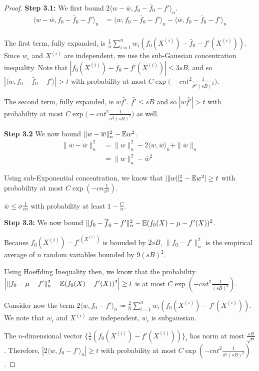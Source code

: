 \begin{proof}
\textbf{Step 3.1:} We first bound $2 \langle w - \bar{w}, f_0 - \bar{f}_0 - f'\rangle_n$.
\begin{align*}
\langle w - \bar{w}, f_0 - \bar{f}_0 - f'\rangle_n &=
      \langle w, f_0 - \bar{f}_0 - f'\rangle_n 
      - \langle \bar{w}, f_0 - \bar{f}_0 - f'\rangle_n \\
\end{align*}

The first term, fully expanded, is $\frac{1}{n} \sum_{i=1}^n w_i (f_0(X^{(i)}) - \bar{f}_0 - f'(X^{(i)}))$. Since $w_i$ and $X^{(i)}$ are independent, we use the sub-Gaussian concentration inequality. Note that $|f_0(X^{(i)}) - \bar{f}_0 - f'(X^{(i)})| \leq 3sB$, and so $|\langle w, f_0 - \bar{f}_0 - f' \rangle| > t$ with probability at most $C \exp\big( - c n t^2 \frac{1}{\sigma^2 (sB)^2} \big)$.

The second term, fully expanded, is $\bar{w} \bar{f'}$. $\bar{f'} \leq sB$ and so $|\bar{w}\bar{f'}| > t$ with probability at most $C \exp\big( - c n t^2 \frac{1}{\sigma^2(sB)^2} \big)$ as well.

\textbf{Step 3.2} We now bound $\| w - \overline{w} \|_n^2 - {\mathbb E} w^2$. 
\begin{align*}
\|w - \bar{w} \|_n^2 &= \|w\|_n^2 - 2 \langle w, \bar{w} \rangle_n + \|\bar{w}\|_n \\
               &= \|w\|_n^2 - \bar{w}^2
\end{align*}

Using sub-Exponential concentration, we know that $| \|w\|_n^2 - {\mathbb E} w^2 | \geq t$ with probability at most $C \exp( - c n \frac{1}{\sigma^2})$. 

$\bar{w} \leq \sigma\frac{1}{cn}$ with probability at least $1-\frac{C}{n}$. 

\textbf{Step 3.3:} We now bound $\| f_0 - \overline{f}_0 - f'\|_n^2 - {\mathbb E}(f_0(X) - \mu - f'(X))^2$.

Because $f_0(X^{(i)}) - f'^(X^{(i)})$ is bounded by $2sB$, $\| f_0 - f'\|_n^2$ is the empirical average of $n$ random variables bounded by $9(sB)^2$. 

Using Hoeffding Inequality then, we know that the probability $\Big| \| f_0 -\mu - f' \|_n^2 - {\mathbb E}(f_0(X) - f '(X))^2 \Big| \geq t $ is at most $C \exp( - c n t^2 \frac{1}{(sB)^4})$. 

Consider now the term $2 \langle w, f_0 - f' \rangle_n \coloneqq \frac{2}{n} \sum_{i=1}^n w_i ( f_0(X^{(i)}) - f'(X^{(i)}))$. We note that $w_i$ and $X^{(i)}$ are independent, $w_i$ is subgaussian. 

The $n$-dimensional vector $\{ \frac{1}{n} ( f_0(X^{(i)}) - f'(X^{(i)})) \}_i$ has norm at most $\frac{sB}{\sqrt{n}}$. Therefore, $|2 \langle w, f_0 - f' \rangle_n | \geq t$ with probability at most $C \exp( - c n t^2 \frac{1}{\sigma^2(sB)^2})$. 


\end{proof}
